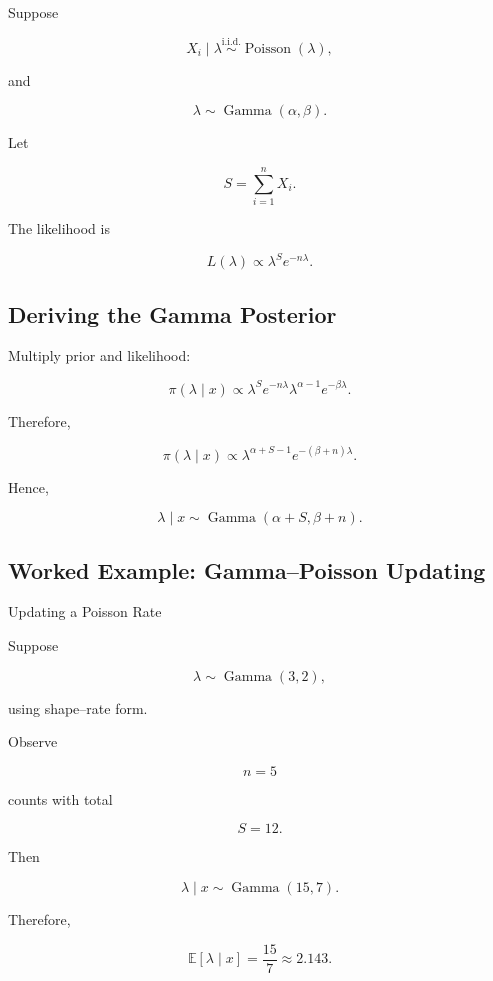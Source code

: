 Suppose

\[
X_i\mid\lambda
\overset{\text{i.i.d.}}{\sim}
\operatorname{Poisson}(\lambda),
\]

and

\[
\lambda
\sim
\operatorname{Gamma}(\alpha,\beta).
\]

Let

\[
S
=
\sum_{i=1}^{n}X_i.
\]

The likelihood is

\[
\boxed{
L(\lambda)
\propto
\lambda^S
e^{-n\lambda}.
}
\]

\subsection{Deriving the Gamma Posterior}
\label{subsec:derive-gamma-posterior}

Multiply prior and likelihood:

\[
\pi(\lambda\mid x)
\propto
\lambda^S
e^{-n\lambda}
\lambda^{\alpha-1}
e^{-\beta\lambda}.
\]

Therefore,

\[
\pi(\lambda\mid x)
\propto
\lambda^{\alpha+S-1}
e^{-(\beta+n)\lambda}.
\]

Hence,

\[
\boxed{
\lambda\mid x
\sim
\operatorname{Gamma}
(
\alpha+S,
\beta+n
).
}
\]

\subsection{Worked Example: Gamma--Poisson Updating}
\label{subsec:worked-gamma-poisson}

\begin{workedexamplebox}{Updating a Poisson Rate}

Suppose

\[
\lambda
\sim
\operatorname{Gamma}(3,2),
\]

using shape--rate form.

Observe

\[
n=5
\]

counts with total

\[
S=12.
\]

Then

\[
\lambda\mid x
\sim
\operatorname{Gamma}
(
15,7
).
\]

Therefore,

\begin{answerbox}
\[
\boxed{
\mathbb{E}
[
\lambda\mid x
]
=
\frac{15}{7}
\approx
2.143.
}
\]
\end{answerbox}

\end{workedexamplebox}

